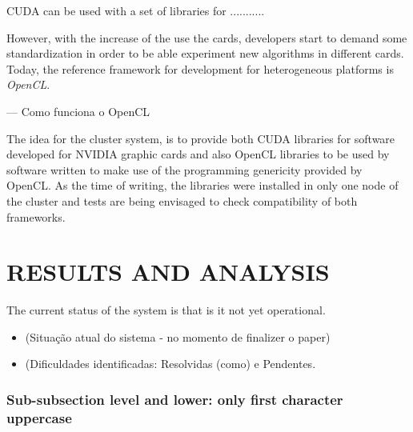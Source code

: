 \documentclass[twoside,a4paper,12pt,english]{inac17}
\begin{document}
CUDA can be used with a set of libraries for ...........

However, with the increase of the use the cards, developers start to demand some
standardization in order to be able experiment new algorithms in different cards. Today, the
reference framework for development for heterogeneous platforms is \textit{OpenCL}\cite{OpenCL}.

--- Como funciona o OpenCL

The idea for the cluster system, is to provide both CUDA libraries for
software developed for NVIDIA graphic cards and also OpenCL libraries to
be used by software written to make use of the programming genericity
provided by OpenCL. As the time of writing, the libraries were installed
in only one node of the cluster and tests are being envisaged to check
compatibility of both frameworks.





\section{RESULTS AND ANALYSIS}

The current status of the system is that is it not yet operational.
\begin{itemize}

\item (Situação atual do sistema - no momento de finalizer o paper)
\item (Dificuldades identificadas: Resolvidas (como) e Pendentes.
  
\end{itemize}

\subsubsection{Sub-subsection level and lower: only first character uppercase}



\end{document}

